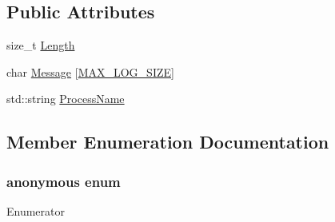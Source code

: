 \subsection*{Public Attributes}
\begin{DoxyCompactItemize}
\item 
size\-\_\-t \hyperlink{classmts_log_message_aa526d750e36255404fcc18019296db0b}{Length}
\item 
char \hyperlink{classmts_log_message_a485b1f3929578eb61b593d0a1d94acf3}{Message} \mbox{[}\hyperlink{classmts_log_message_a19f4c6a6fa57d414f267a4006ed7e97ca547ed9439424c96af36d3e0cc57fc891}{M\-A\-X\-\_\-\-L\-O\-G\-\_\-\-S\-I\-Z\-E}\mbox{]}
\item 
std\-::string \hyperlink{classmts_log_message_a68ccd87d2de4c8b27710f43dd5071b5d}{Process\-Name}
\end{DoxyCompactItemize}


\subsection{Member Enumeration Documentation}
\hypertarget{classmts_log_message_a19f4c6a6fa57d414f267a4006ed7e97c}{\subsubsection[{anonymous enum}]{\setlength{\rightskip}{0pt plus 5cm}anonymous enum}}\label{classmts_log_message_a19f4c6a6fa57d414f267a4006ed7e97c}
\begin{Desc}
\item[Enumerator]\par
\begin{description}
\item[{\em 
\hypertarget{classmts_log_message_a19f4c6a6fa57d414f267a4006ed7e97ca547ed9439424c96af36d3e0cc57fc891}{M\-A\-X\-\_\-\-L\-O\-G\-\_\-\-S\-I\-Z\-E}\label{classmts_log_message_a19f4c6a6fa57d414f267a4006ed7e97ca547ed9439424c96af36d3e0cc57fc891}
}]\end{description}
\end{Desc}


